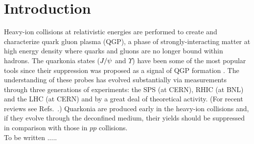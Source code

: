\documentclass[aps,prc,preprint,superscriptaddress,showpacs,showkeys,amsmath]{revtex4-1}
\begin{document}

\maketitle


\section{Introduction}

Heavy-ion collisions at relativistic energies are performed to create and characterize 
quark gluon plasma (QGP), a phase of strongly-interacting matter at high energy density 
where quarks and gluons are no longer bound within hadrons.
The quarkonia states ($J/\psi$ and $\Upsilon$) have been some of the most popular tools 
since their suppression was proposed as a signal of QGP formation \cite{Matsui:1986dk}.
The understanding of these probes has evolved substantially via measurements 
through three generations of experiments: the SPS (at CERN), RHIC (at BNL) and the LHC (at CERN) 
and by a great deal of theoretical activity. (For recent reviews see 
Refs.~\cite{Schukraft:2013wba,Kluberg:2009wc,Brambilla:2010cs}.)
Quarkonia are produced early in the heavy-ion collisions and, if they evolve
through the deconfined medium, their yields should be suppressed in comparison with those in $pp$ collisions. \\
{\color{red} To be written .....}


\end{document}
